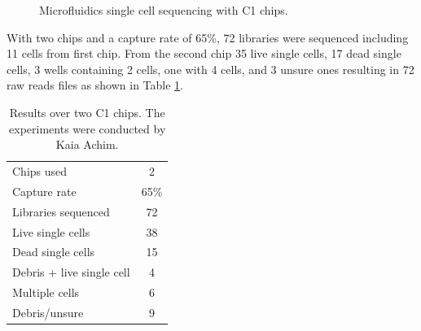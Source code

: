 \begin{figure}[h]
        \myfloatalign
         \quad
        \caption{Microfluidics single cell sequencing with C1 chips.}\label{fig:singlecell_chip}
\end{figure}
	

	With two chips and a capture rate of 65\%, 72 libraries were sequenced including 11 cells from first chip. From the second chip 35 live single cells, 17 dead single cells, 3 wells containing 2 cells, one with 4 cells, and 3 unsure ones resulting in 72 raw reads files as shown in Table \ref{tab:rna_seq_res}.\\	
	
\begin{table}
    \myfloatalign
  \begin{tabularx}{\textwidth}{X|c} \toprule
    Chips used & 2 \\
    Capture rate  & 65\%\\
    Libraries sequenced & 72 \\
	Live single cells & 38 \\
	Dead single cells & 15 \\
	Debris + live single cell & 4 \\
	Multiple cells & 6 \\
	Debris/unsure & 9\\
  \end{tabularx}
  \caption{Results over two C1 chips. The experiments were conducted by Kaia Achim.}\label{tab:rna_seq_res}
\end{table}
  	
